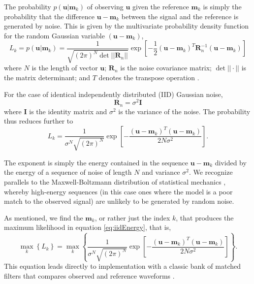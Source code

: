 The probability $p(\mathbf{u}|\mathbf{m}_k)$ of observing $\mathbf{u}$ given the reference $\mathbf{m}_k$ is simply the probability that the difference $\mathbf{u}-\mathbf{m}_k$ between the signal and the reference is generated by noise. This is given by the multivariate probability density function for the random Gaussian variable $(\mathbf{u}-\mathbf{m}_k)$, 
\begin{equation}\label{eq:Main}
L_k = p(\mathbf{u}|\mathbf{m}_k) = \frac{1}{  \sqrt{ (2\pi)^N \det || \mathbf{R}_n||} } \exp\left[ -\frac{1}{2}  (\mathbf{u}-\mathbf{m}_k)^T \mathbf{R}_n^{-1} (\mathbf{u}-\mathbf{m}_k) \right]
\end{equation}
where $N$ is the length of vector $\mathbf{u}$; $\mathbf{R}_n$ is the noise covariance matrix; $\det||{\cdot}||$ is the matrix determinant; and $T$ denotes the transpose operation  \citep{helstrom_statistical_1968, wainstein_extraction_1962}.

For the case of identical independently distributed (IID) Gaussian noise, 
\begin{equation}
\mathbf{R}_n=\sigma^2 \mathbf{I}
\end{equation}
where $\mathbf{I}$ is the identity matrix and $\sigma^2$ is the variance of the noise. The probability thus reduces further to
\begin{equation}\label{eq:iidEnergy}
L_k = \frac{1}{  \sigma^N \sqrt{ (2\pi)^N}   } \exp\left[ -\frac{(\mathbf{u}-\mathbf{m}_k)^T(\mathbf{u}-\mathbf{m}_k)} {2 N \sigma^2 } \right].
\end{equation}

The exponent is simply the energy contained in the sequence $\mathbf{u}-\mathbf{m}_k$ divided by the
energy of a sequence of noise of length $N$ and variance $\sigma^2$. We recognize parallels to the Maxwell-Boltzmann distribution of statistical mechanics \citep{reif_fundamentals_1965}, whereby high-energy sequences (in this case ones where the model is a poor match to the observed signal) are unlikely to be generated by random noise.  

As mentioned, we find the $\mathbf{m}_k$, or rather just the index $k$, that produces the maximum likelihood in equation \ref{eq:iidEnergy}, that is,
\begin{equation}
\max_k   \left\{ L_k \right\} =  \max_k  \left\{ \frac{1}{   \sigma^N\sqrt{ (2\pi)^N}  } \exp\left[ -\frac{(\mathbf{u}-\mathbf{m}_k)^T(\mathbf{u}-\mathbf{m}_k)} {2 N \sigma^2 } \right] \right\}. 
\end{equation}
This equation leads directly to implementation with a classic bank of matched filters that compares observed and reference waveforms \citep{wainstein_extraction_1962, helstrom_statistical_1968}. 


